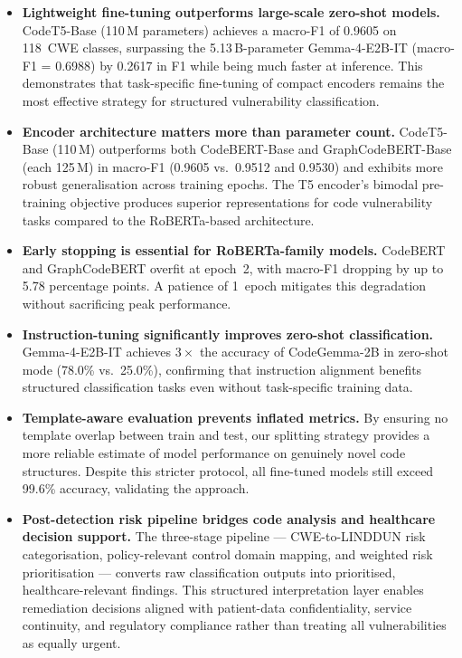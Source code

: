 \documentclass[conference]{IEEEtran}
\begin{document}
\begin{itemize}
    \item \textbf{Lightweight fine-tuning outperforms large-scale
          zero-shot models.}  CodeT5-Base (110\,M parameters) achieves a
          macro-F1 of 0.9605 on 118~CWE classes, surpassing the
          5.13\,B-parameter Gemma-4-E2B-IT (macro-F1 = 0.6988) by 0.2617
          in F1 while being much faster at inference.  This
          demonstrates that task-specific fine-tuning of compact encoders
          remains the most effective strategy for structured vulnerability
          classification.

    \item \textbf{Encoder architecture matters more than parameter count.}
          CodeT5-Base (110\,M) outperforms both CodeBERT-Base and
          GraphCodeBERT-Base (each 125\,M) in macro-F1 (0.9605 vs.\ 0.9512
          and 0.9530) and exhibits more robust generalisation across
          training epochs.  The T5 encoder's bimodal pre-training objective
          produces superior representations for code vulnerability tasks
          compared to the RoBERTa-based architecture.

    \item \textbf{Early stopping is essential for RoBERTa-family models.}
          CodeBERT and GraphCodeBERT overfit at epoch~2, with macro-F1
          dropping by up to 5.78 percentage points.  A patience of
          1~epoch mitigates this degradation without sacrificing peak
          performance.

    \item \textbf{Instruction-tuning significantly improves zero-shot
          classification.}  Gemma-4-E2B-IT achieves $3\times$ the accuracy
          of CodeGemma-2B in zero-shot mode (78.0\% vs.\ 25.0\%),
          confirming that instruction alignment benefits structured
          classification tasks even without task-specific training data.

    \item \textbf{Template-aware evaluation prevents inflated metrics.}
          By ensuring no template overlap between train and test, our
          splitting strategy provides a more reliable estimate of model
          performance on genuinely novel code structures.  Despite this
          stricter protocol, all fine-tuned models still exceed 99.6\%
          accuracy, validating the approach.

    \item \textbf{Post-detection risk pipeline bridges code analysis
          and healthcare decision support.}
          The three-stage pipeline --- CWE-to-LINDDUN risk categorisation,
          policy-relevant control domain mapping, and weighted risk
          prioritisation --- converts raw classification outputs into
          prioritised, healthcare-relevant findings.  This structured
          interpretation layer enables remediation decisions aligned with
          patient-data confidentiality, service continuity, and regulatory
          compliance rather than treating all vulnerabilities as equally
          urgent.
\end{itemize}
\end{document}
